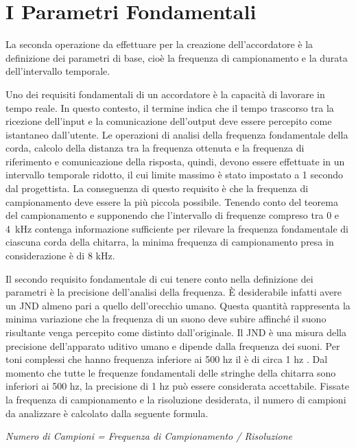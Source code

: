 \chapter{I Parametri Fondamentali}\label{cap:parametri}

La seconda operazione da effettuare per la creazione dell'accordatore è la definizione dei parametri di base, cioè la frequenza di campionamento e la durata dell'intervallo temporale.  

Uno dei requisiti fondamentali di un accordatore è la capacità di lavorare in tempo reale. 
In questo contesto, il termine indica che il tempo trascorso tra la ricezione dell'input e la comunicazione dell'output deve essere percepito come istantaneo dall'utente. 
Le operazioni di analisi della frequenza fondamentale della corda, calcolo della distanza tra la frequenza ottenuta e la frequenza di riferimento e comunicazione della risposta, quindi, devono essere effettuate in un intervallo temporale ridotto, il cui limite massimo è stato impostato a 1 secondo dal progettista.
La conseguenza di questo requisito è che la frequenza di campionamento deve essere la più piccola possibile. 
Tenendo conto del teorema del campionamento e supponendo che l'intervallo di frequenze compreso tra 0 e \mbox{4 kHz} contenga informazione sufficiente per rilevare la frequenza fondamentale di ciascuna corda della chitarra, la minima frequenza di campionamento presa in considerazione è di 8 kHz.

Il secondo requisito fondamentale di cui tenere conto nella definizione dei parametri è la precisione dell'analisi della frequenza.
È desiderabile infatti avere un \mbox{JND} almeno pari a quello dell'orecchio umano. 
Questa quantità rappresenta la minima variazione che la frequenza di un suono deve subire affinché il suono risultante venga percepito come distinto dall'originale. 
Il \mbox{JND} è una misura della precisione dell'apparato uditivo umano e dipende dalla frequenza dei suoni.
Per toni complessi che hanno frequenza inferiore ai 500 hz il è di circa 1 hz . 
Dal momento che tutte le frequenze fondamentali delle stringhe della chitarra sono inferiori ai 500 hz, la precisione di 1 hz può essere considerata accettabile.
Fissate la frequenza di campionamento e la risoluzione desiderata, il numero di campioni da analizzare è calcolato dalla seguente formula.

\vspace{0.2cm}
\centerline{\textit{Numero di Campioni = Frequenza di Campionamento / Risoluzione}}
\vspace{0.2cm}

